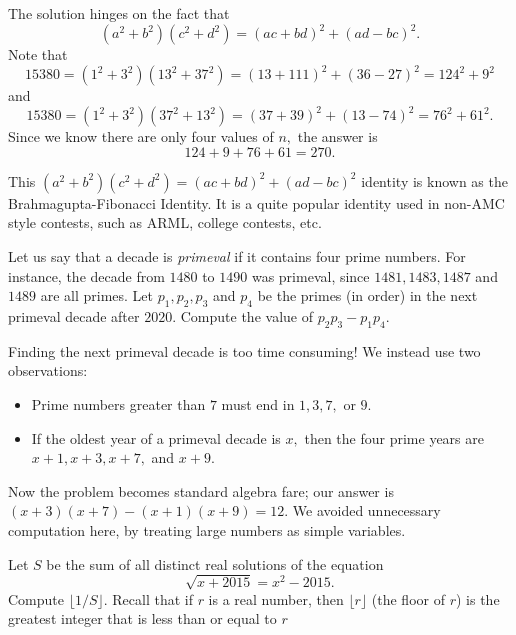 \documentclass{article}
\begin{document}
\begin{sol}
The solution hinges on the fact that
\[(a^2+b^2)(c^2+d^2)=(ac+bd)^2+(ad-bc)^2.\]
Note that
\[15380=(1^2+3^2)(13^2+37^2)=(13+111)^2+(36-27)^2=124^2+9^2\]
and
\[15380=(1^2+3^2)(37^2+13^2)=(37+39)^2+(13-74)^2=76^2+61^2.\]
Since we know there are only four values of $n,$ the answer is
\[124+9+76+61=270.\]
\end{sol}

This $(a^2+b^2)(c^2+d^2)=(ac+bd)^2+(ad-bc)^2$ identity is known as the Brahmagupta-Fibonacci Identity. It is a quite popular identity used in non-AMC style contests, such as ARML, college contests, etc.

\begin{exam}[2017-2018 Mandelbrot]
Let us say that a decade is \emph{primeval} if it contains four prime numbers. For instance, the decade from $1480$ to $1490$ was primeval, since $1481, 1483, 1487$ and $1489$ are all primes. Let $p_1,p _2, p_3$ and $p_4$ be the primes (in order) in the  next primeval decade after $2020.$ Compute the value of $p_2 p_3-p_1 p_4$.
\end{exam}

\begin{sol}
Finding the next primeval decade is too time consuming! We instead use two observations:
\begin{itemize}
\item Prime numbers greater than $7$ must end in $1,3,7,$ or $9.$
\item If the oldest year of a primeval decade is $x,$ then the four prime years are $x+1,x+3,x+7,$ and $x+9.$
\end{itemize}
Now the problem becomes standard algebra fare; our answer is $(x+3)(x+7)-(x+1)(x+9) = 12.$ We avoided unnecessary computation here, by treating large numbers as simple variables.
\end{sol}

\begin{exam}{6}
Let $S$ be the sum of all distinct real solutions of the equation 
$$\sqrt{x + 2015} = x^2 - 2015.$$
Compute $\lfloor 1/S \rfloor$.  Recall that if $r$ is a real number, then $\lfloor r \rfloor$ (the floor of $r$) is the greatest integer that is less than or equal to $r$
\end{exam}
\end{document}
